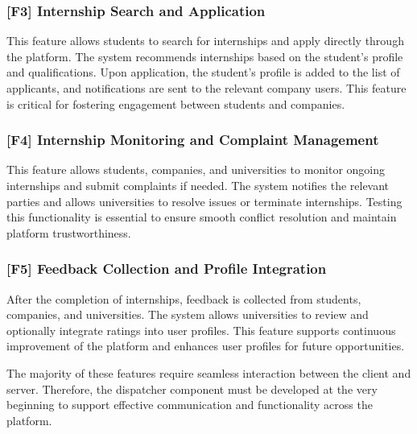 \subsubsection*{[F3] Internship Search and Application}
This feature allows students to search for internships and apply directly through the platform. The system recommends internships based on the student’s profile and qualifications. Upon application, the student’s profile is added to the list of applicants, and notifications are sent to the relevant company users. This feature is critical for fostering engagement between students and companies.

\subsubsection*{[F4] Internship Monitoring and Complaint Management}
This feature allows students, companies, and universities to monitor ongoing internships and submit complaints if needed. The system notifies the relevant parties and allows universities to resolve issues or terminate internships. Testing this functionality is essential to ensure smooth conflict resolution and maintain platform trustworthiness.

\subsubsection*{[F5] Feedback Collection and Profile Integration}
After the completion of internships, feedback is collected from students, companies, and universities. The system allows universities to review and optionally integrate ratings into user profiles. This feature supports continuous improvement of the platform and enhances user profiles for future opportunities.

The majority of these features require seamless interaction between the client and server. Therefore, the dispatcher component must be developed at the very beginning to support effective communication and functionality across the platform.

\newpage